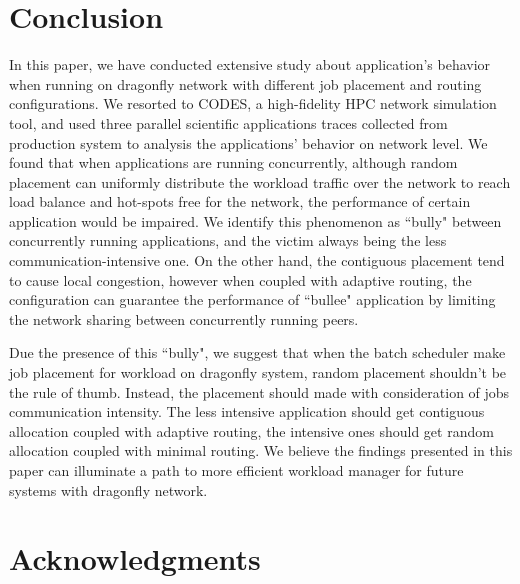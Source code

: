 \documentclass[conference,compsoc]{IEEEtran}
\begin{document}
\section{Conclusion}
\label{sec:conclusion}

In this paper, we have conducted extensive study about application's behavior when running on dragonfly network with different job placement and routing configurations. We resorted to CODES, a high-fidelity HPC network simulation tool, and used three parallel scientific applications traces collected from production system to analysis the applications' behavior on network level. We found that when applications are running concurrently, although random placement can uniformly distribute the workload traffic over the network to reach load balance and hot-spots free for the network, the performance of certain application would be impaired. We identify this phenomenon as ``bully" between concurrently running applications, and the victim always being the less communication-intensive one. On the other hand, the contiguous placement tend to cause local congestion, however when coupled with adaptive routing, the configuration can guarantee the performance of ``bullee" application by limiting the network sharing between concurrently running peers. 

Due the presence of this ``bully", we suggest that when the batch scheduler make job placement for workload on dragonfly system, random placement shouldn't be the rule of thumb. Instead, the placement should made with consideration of jobs communication intensity. The less intensive application should get contiguous allocation coupled with adaptive routing, the intensive ones should get random allocation coupled with minimal routing. We believe the findings presented in this paper can illuminate a path to more efficient workload manager for future systems with dragonfly network.






\ifCLASSOPTIONcompsoc
  \section*{Acknowledgments}
\else
\fi
\end{document}

